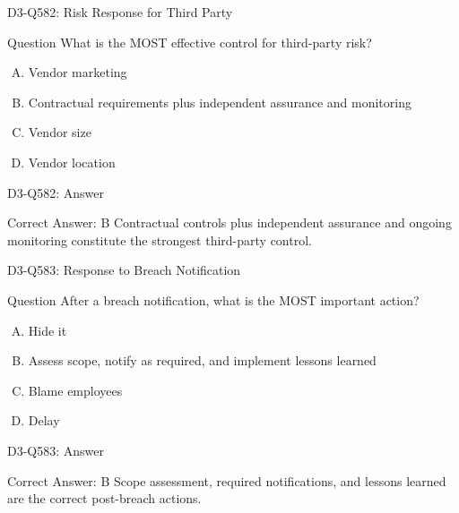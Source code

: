 \documentclass{beamer}
\begin{document}
	\begin{frame}{D3-Q582: Risk Response for Third Party}
		\begin{block}{Question}
			What is the MOST effective control for third-party risk?
		\end{block}
		\begin{enumerate}[(A)]
			\item Vendor marketing
			\item Contractual requirements plus independent assurance and monitoring
			\item Vendor size
			\item Vendor location
		\end{enumerate}
	\end{frame}
	\begin{frame}{D3-Q582: Answer}
		\begin{block}{Correct Answer: B}
			Contractual controls plus independent assurance and ongoing monitoring constitute the strongest third-party control.
		\end{block}
	\end{frame}
	
	\begin{frame}{D3-Q583: Response to Breach Notification}
		\begin{block}{Question}
			After a breach notification, what is the MOST important action?
		\end{block}
		\begin{enumerate}[(A)]
			\item Hide it
			\item Assess scope, notify as required, and implement lessons learned
			\item Blame employees
			\item Delay
		\end{enumerate}
	\end{frame}
	\begin{frame}{D3-Q583: Answer}
		\begin{block}{Correct Answer: B}
			Scope assessment, required notifications, and lessons learned are the correct post-breach actions.
		\end{block}
	\end{frame}
	
\end{document}
